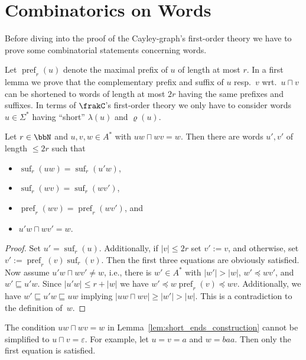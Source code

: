 \documentclass[a4paper,numberwithinsect,USenglish]{lipics-v2018}
\theoremstyle{plain}
\theoremstyle{remark}
\DeclareMathOperator{\pref}{pref}
\DeclareMathOperator{\suf}{suf}
\newcommand{\lft}[1]{\lambda(#1)}
\newcommand{\rght}[1]{\varrho(#1)}
\newcommand{\cQ}{\frakC}
\begin{document}
	
\section{Combinatorics on Words}
Before diving into the proof of the Cayley-graph's first-order theory we have to prove some combinatorial statements concerning words.

Let $\pref_r(u)$ denote the maximal prefix of $u$ of length at most $r$.
In a first lemma we prove that the complementary prefix and suffix of $u$ resp.~$v$ wrt.~$u\sqcap v$ can be shortened to words of length at most $2r$ having the same prefixes and suffixes. In terms of $\cQ$'s first-order theory we only have to consider words $u\in\varSigma^*$ having ``short'' $\lft{u}$ and $\rght{u}$.

\begin{lemma}\label{lem:short_ends_construction}
	Let $r\in\bbN$ and $u,v,w \in A^\ast$ with $uw\sqcap wv = w$. %
	Then there are words $u',v'$ of length $\leq 2r$ such that
	\begin{itemize}
		\item $\suf_r(uw) = \suf_r(u'w)$,
		\item $\suf_r(wv) = \suf_r(wv')$,
		\item $\pref_r(wv) = \pref_r(wv')$, and
		\item $u'w\sqcap wv' = w$.
	\end{itemize}
\end{lemma}
\begin{proof}
	Set $u'=\suf_r(u)$. Additionally, if $|v|\leq 2r$ set $v':=v$, and otherwise, set $v':=\pref_r(v)\suf_r(v)$. Then the first three equations are obviously satisfied. Now assume $u'w\sqcap wv'\neq w$, i.e., there is $w'\in A^*$ with $|w'|>|w|$, $w'\preceq wv'$, and $w'\sqsubseteq u'w$. Since $|u'w|\leq r+|w|$ we have $w'\preceq w\pref_r(v)\preceq wv$. Additionally, we have $w'\sqsubseteq u'w\sqsubseteq uw$ implying $|uw\sqcap wv|\geq|w'|>|w|$. This is a contradiction to the definition of~$w$.
\end{proof}

\begin{remark}
	The condition $uw\sqcap wv=w$ in Lemma~\ref{lem:short_ends_construction} cannot be simplified to $u\sqcap v=\varepsilon$. For example, let $u=v=a$ and $w=baa$. Then only the first equation is satisfied.
\end{remark}
\end{document}
